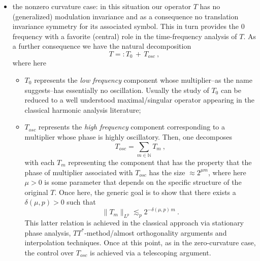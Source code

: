 \documentclass[a4paper,reqno]{amsart}
\numberwithin{equation}{section}
\theoremstyle{definition}
\newcommand{\N}{\mathbb{N}}
\renewcommand{\P}{\mathbb{P}}
\def\d{\delta}
\begin{document}
\begin{itemize}
\begin{itemize}
		\item  Finally, by further exploiting the almost orthogonality among the forests within each $\P_n$, one obtains the control over $T_{\P_n}:=\sum_{P\in\P_n} T_P$ by showing that for a given $1<p<\infty$ there exists $\d(p)>0$ such that
		\begin{equation}\label{zdec2}
			\|T_{\P_n}\|_{L^p}\lesssim_p 2^{-\d(p)\,n}\:.
		\end{equation}
		Combining \eqref{zdec}, \eqref{zdec1} and \eqref{zdec2}  one derives the global control over $T$ via a simple telescoping argument.
	\end{itemize}
	$\newline$
	
	\item \textsf{the nonzero curvature case}:  in this situation our operator $T$ has no (generalized) modulation invariance and as a consequence no translation invariance symmetry for its associated symbol. This in turn provides the $0$ frequency with a favorite (central) role in the time-frequency analysis of $T$. As a further consequence we have the natural decomposition
	\begin{equation}\label{nonzdec}
		T=:T_{0}\,+\,T_{osc}\:,
	\end{equation}
	where here
	\begin{itemize}
		\item $T_0$ represents the \emph{low frequency} component whose multiplier--as the name suggests--has essentially no oscillation. Usually the study of $T_0$ can be reduced to a well understood maximal/singular operator appearing in the classical harmonic analysis literature;
		
		
		\item $T_{osc}$ represents the \emph{high frequency} component corresponding to a multiplier whose phase is highly oscillatory. Then, one decomposes
		\begin{equation}\label{nonzdec1}
			T_{osc}=\sum_{m\in\N} T_{m}\:,
		\end{equation}
		with each $T_m$ representing the component that has the property that the phase of multiplier associated with $T_{osc}$ has the size $\approx 2^{\mu m}$, where here $\mu>0$ is some parameter that depends on the specific structure of the original $T$. Once here, the generic goal is to show that there exists a $\d(\mu,p)>0$ such that
		\begin{equation}\label{nonzdec2}
			\|T_{m}\|_{L^p}\lesssim_p 2^{-\d(\mu,p)\,m}\:.
		\end{equation}
		This latter relation is achieved in the classical approach via stationary phase analysis, $TT^{*}$-method/almost orthogonality arguments and interpolation techniques. Once at this point, as in the zero-curvature case, the control over $T_{osc}$ is achieved via a telescoping argument.
	\end{itemize}
\end{itemize}
\end{document}
